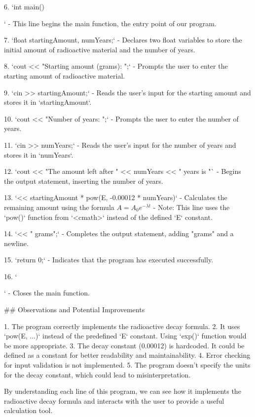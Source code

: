\documentclass{article}
\begin{document}
6. `int main(){`
   - This line begins the main function, the entry point of our program.

7. `float startingAmount, numYears;`
   - Declares two float variables to store the initial amount of radioactive material and the number of years.

8. `cout << "Starting amount (grams): ";`
   - Prompts the user to enter the starting amount of radioactive material.

9. `cin >> startingAmount;`
   - Reads the user's input for the starting amount and stores it in `startingAmount`.

10. `cout << "Number of years: ";`
    - Prompts the user to enter the number of years.

11. `cin >> numYears;`
    - Reads the user's input for the number of years and stores it in `numYears`.

12. `cout << "The amount left after " << numYears << " years is "`
    - Begins the output statement, inserting the number of years.

13. `<< startingAmount * pow(E, -0.00012 * numYears)`
    - Calculates the remaining amount using the formula $A = A_0 e^{-\lambda t}$
    - Note: This line uses the `pow()` function from `<cmath>` instead of the defined `E` constant.

14. `<< " grams\n";`
    - Completes the output statement, adding "grams" and a newline.

15. `return 0;`
    - Indicates that the program has executed successfully.

16. `}`
    - Closes the main function.

## Observations and Potential Improvements

1. The program correctly implements the radioactive decay formula.
2. It uses `pow(E, ...)` instead of the predefined `E` constant. Using `exp()` function would be more appropriate.
3. The decay constant (0.00012) is hardcoded. It could be defined as a constant for better readability and maintainability.
4. Error checking for input validation is not implemented.
5. The program doesn't specify the units for the decay constant, which could lead to misinterpretation.

By understanding each line of this program, we can see how it implements the radioactive decay formula and interacts with the user to provide a useful calculation tool.
\end{document}
